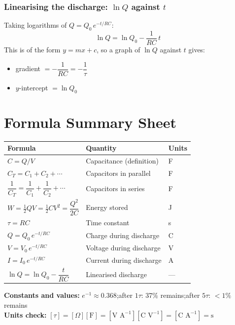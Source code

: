 \subsubsection*{Linearising the discharge: $\ln Q$ against $t$}

Taking logarithms of $Q = Q_0\,e^{-t/RC}$:
$$\ln Q = \ln Q_0 - \frac{1}{RC}\,t$$
This is of the form $y = mx + c$, so a graph of $\ln Q$ against $t$ gives:
\begin{itemize}[itemsep=2pt]
  \item gradient $= -\dfrac{1}{RC} = -\dfrac{1}{\tau}$
  \item $y$-intercept $= \ln Q_0$
\end{itemize}

\section{Formula Summary Sheet}

\begin{minipage}{\linewidth}
\begin{tcolorbox}[colback=lightgold, colframe=accentgold]
\renewcommand{\arraystretch}{1.8}
\begin{tabular}{@{}lll@{}}
\toprule
\textbf{Formula} & \textbf{Quantity} & \textbf{Units} \\
\midrule
$C = Q/V$ & Capacitance (definition) & F \\
$C_T = C_1 + C_2 + \cdots$ & Capacitors in parallel & F \\
$\dfrac{1}{C_T} = \dfrac{1}{C_1} + \dfrac{1}{C_2} + \cdots$ & Capacitors in series & F \\
$W = \tfrac{1}{2}QV = \tfrac{1}{2}CV^2 = \dfrac{Q^2}{2C}$ & Energy stored & J \\
$\tau = RC$ & Time constant & s \\
$Q = Q_0\,e^{-t/RC}$ & Charge during discharge & C \\
$V = V_0\,e^{-t/RC}$ & Voltage during discharge & V \\
$I = I_0\,e^{-t/RC}$ & Current during discharge & A \\
$\ln Q = \ln Q_0 - \dfrac{t}{RC}$ & Linearised discharge & — \\
\bottomrule
\end{tabular}
\end{tcolorbox}

\vspace{0.5em}
\begin{tcolorbox}[colback=lightblue, colframe=darkblue]
\textbf{Constants and values:}\quad
$e^{-1} \approx 0.368$;\quad after $1\tau$: 37\% remains;\quad after $5\tau$: $<1\%$ remains\\[0.3em]
\textbf{Units check:} $[\tau] = [\Omega][\text{F}] = [\text{V A}^{-1}][\text{C V}^{-1}] = [\text{C A}^{-1}] = \text{s}$
\end{tcolorbox}
\end{minipage}

